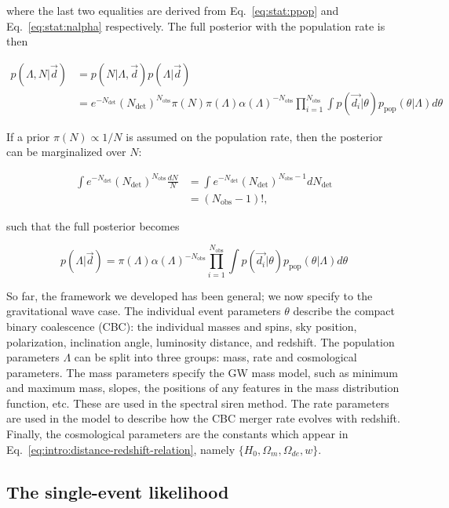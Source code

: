 \documentclass[%
preprint,
nofootinbib,
 amsmath,amssymb,
 aps,
]{revtex4-2}
\newcommand{\given}[2]{p( #1 | #2 )}
\newcommand{\ppop}[0]{p_{\text{pop}}}
\newcommand{\ndet}[0]{N_{\text{det}}}
\newcommand{\nobs}[0]{N_{\text{obs}}}
\begin{document}
where the last two equalities are derived from Eq.~\eqref{eq:stat:ppop} and
Eq.~\eqref{eq:stat:nalpha} respectively. The full posterior with the population rate is then

\begin{align}
	\nonumber
	\given{\Lambda, N }{\vec{d}} & = \given{N}{\Lambda, \vec{d}}\given{\Lambda}{\vec{d}}                    \\
	                             & = e^{-\ndet}(\ndet)^{\nobs} \pi(N) \pi(\Lambda) \alpha(\Lambda)^{-\nobs}
	\prod_{i=1}^{\nobs} \int \given{\vec{d_i}}{\theta} \ppop(\theta | \Lambda ) d\theta
\end{align}

If a prior $\pi(N) \propto 1/N$ is assumed on the population rate, then the posterior can be
marginalized over $N$:

\begin{align}
	\int e^{-\ndet}(\ndet)^{\nobs} \frac{dN}{N} & = \int e^{-\ndet}(\ndet)^{\nobs - 1} d\ndet \\
	                                            & = (\nobs - 1)!,
\end{align}

such that the full posterior becomes

\begin{equation}
	\label{eq:stat:full-hierarchical-posterior}
	\given{\Lambda}{\vec{d}} = \pi(\Lambda) \alpha(\Lambda)^{-\nobs}
	\prod_{i=1}^{\nobs} \int \given{\vec{d_i}}{\theta} \ppop(\theta | \Lambda ) d\theta
\end{equation}

So far, the framework we developed has been general; we now specify to the gravitational wave case.
The individual event parameters $\theta$ describe the compact binary coalescence (CBC): the
individual masses and spins, sky position, polarization, inclination angle, luminosity distance,
and redshift. The population parameters $\Lambda$ can be split into three groups: mass, rate and
cosmological parameters. The mass parameters specify the GW mass model, such as minimum and maximum
mass, slopes, the positions of any features in the mass distribution function, etc. These are used
in the spectral siren method. The rate parameters are used in the model to describe how the CBC
merger rate evolves with redshift. Finally, the cosmological parameters are the constants which
appear in Eq.~\eqref{eq:intro:distance-redshift-relation}, namely $\{H_0, \Omega_m, \Omega_{de},
	w\}$.

\subsection{The single-event likelihood}
\end{document}
